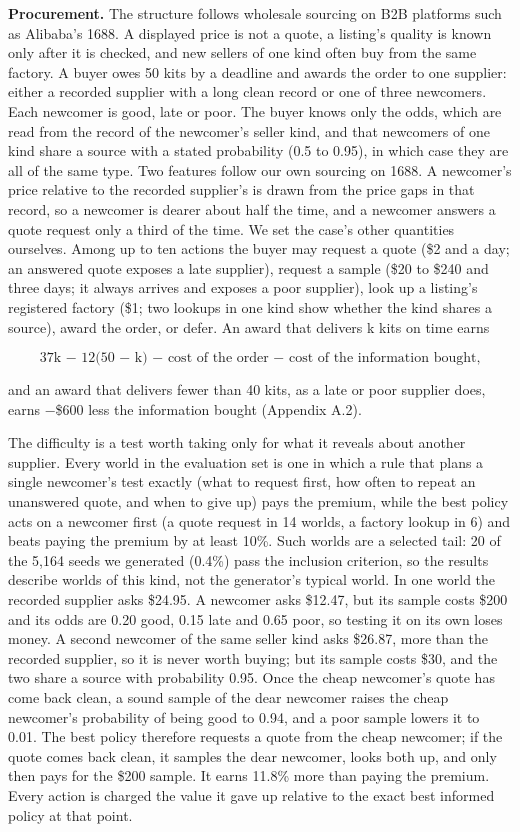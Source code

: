 \textbf{Procurement.} The structure follows wholesale sourcing on B2B platforms such as Alibaba's 1688. A displayed price
is not a quote, a listing's quality is known only after it is checked, and new sellers of one kind often buy from the
same factory. A buyer owes 50 kits by a deadline and awards the order to one supplier: either a recorded supplier with
a long clean record or one of three newcomers. Each newcomer is good, late or poor. The buyer knows only the odds,
which are read from the record of the newcomer's seller kind, and that newcomers of one kind share a source with a
stated probability (0.5 to 0.95), in which case they are all of the same type. Two features follow our own sourcing on
1688. A newcomer's price relative to the recorded supplier's is drawn from the price gaps in that record, so a
newcomer is dearer about half the time, and a newcomer answers a quote request only a third of the time. We set the
case's other quantities ourselves. Among up to ten actions the buyer may request a quote (\$2 and a day; an answered
quote exposes a late supplier), request a sample (\$20 to \$240 and three days; it always arrives and exposes a poor
supplier), look up a listing's registered factory (\$1; two lookups in one kind show whether the kind shares a
source), award the order, or defer. An award that delivers k kits on time earns

\[ \text{37k − 12(50 − k) − cost of the order − cost of the information bought,} \tag{2} \]

and an award that delivers fewer than 40 kits, as a late or poor supplier does, earns −\$600 less the information
bought (Appendix A.2).

The difficulty is a test worth taking only for what it reveals about another supplier. Every world in the evaluation
set is one in which a rule that plans a single newcomer's test exactly (what to request first, how often to repeat an
unanswered quote, and when to give up) pays the premium, while the best policy acts on a newcomer first (a quote
request in 14 worlds, a factory lookup in 6) and beats paying the premium by at least 10\%. Such worlds are a selected
tail: 20 of the 5,164 seeds we generated (0.4\%) pass the inclusion criterion, so the results describe worlds of this
kind, not the generator's typical world. In one world the recorded supplier asks \$24.95. A newcomer asks \$12.47, but its sample
costs \$200 and its odds are 0.20 good, 0.15 late and 0.65 poor, so testing it on its own loses money. A second
newcomer of the same seller kind asks \$26.87, more than the recorded supplier, so it is never worth buying; but its
sample costs \$30, and the two share a source with probability 0.95. Once the cheap newcomer's quote has come back
clean, a sound sample of the dear newcomer raises the cheap newcomer's probability of being good to 0.94, and a poor
sample lowers it to 0.01. The best policy therefore requests a quote from the cheap newcomer; if the quote comes back
clean, it samples the dear newcomer, looks both up, and only then pays for the \$200 sample. It earns 11.8\% more than
paying the premium. Every action is charged the value it gave up relative to the exact best informed policy at that
point.

